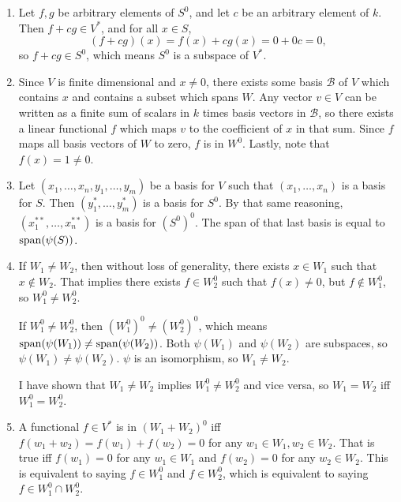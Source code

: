 \documentclass{article}
\begin{document}
\bigskip
\par
\begin{prob}
\end{prob}
\begin{enumerate}[label=(\alph*)]
    \item Let $f,g$ be arbitrary elements of $S^0$, and let $c$ be an arbitrary element of $k$. Then $f+cg \in V^*$, and for all $x \in S$,
        \[ (f+cg)(x) = f(x)+cg(x) = 0+0c=0, \]
        so $f+cg \in S^0$, which means $S^0$ is a subspace of $V^*$.
    \item Since $V$ is finite dimensional and $x \neq 0$, there exists some basis $\mathcal{B}$ of $V$ which contains $x$ and contains a subset which spans $W$. Any vector $v \in V$ can be written as a finite sum of scalars in $k$ times basis vectors in $\mathcal{B}$, so there exists a linear functional $f$ which maps $v$ to the coefficient of $x$ in that sum. Since $f$ maps all basis vectors of $W$ to zero, $f$ is in $W^0$. Lastly, note that $f(x)=1\neq 0$.
    \item Let $(x_1, \dots, x_n, y_1, \dots, y_m)$ be a basis for $V$ such that $(x_1, \dots, x_n)$ is a basis for $S$. Then $(y_1^*, \dots, y_m^*)$ is a basis for $S^0$. By that same reasoning, $(x_1^{**}, \dots, x_n^{**})$ is a basis for $(S^0)^0$. The span of that last basis is equal to $\operatorname{span}(\psi(S))$.
    \item If $W_1 \neq W_2$, then without loss of generality, there exists $x \in W_1$ such that $x \not\in W_2$. That implies there exists $f \in W_2^0$ such that $f(x) \neq 0$, but $f \not\in W_1^0$, so $W_1^0 \neq W_2^0$.
        \par
        If $W_1^0 \neq W_2^0$, then $(W_1^0)^0 \neq (W_2^0)^0$, which means $\operatorname{span}(\psi(W_1)) \neq \operatorname{span}(\psi(W_2))$. Both $\psi(W_1)$ and $\psi(W_2)$ are subspaces, so $\psi(W_1)\neq \psi(W_2)$. $\psi$ is an isomorphism, so $W_1 \neq W_2$.
        \par
        I have shown that $W_1 \neq W_2$ implies $W_1^0 \neq W_2^0$ and vice versa, so $W_1 = W_2$ iff $W_1^0 = W_2^0$.
    \item A functional $f \in V^*$ is in $(W_1 + W_2)^0$ iff $f(w_1+w_2)=f(w_1)+f(w_2)=0$ for any $w_1 \in W_1, w_2 \in W_2$. That is true iff $f(w_1)=0$ for any $w_1 \in W_1$ and $f(w_2)=0$ for any $w_2 \in W_2$. This is equivalent to saying $f \in W_1^0$ and $f \in W_2^0$, which is equivalent to saying $f \in W_1^0 \cap W_2^0$.
\end{enumerate}
\end{document}
